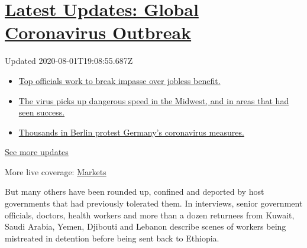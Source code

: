 \hypertarget{latest-updates-global-coronavirus-outbreak}{%
\section{\texorpdfstring{\href{https://www.nytimes3xbfgragh.onion/2020/08/01/world/coronavirus-covid-19.html?action=click\&pgtype=Article\&state=default\&region=MAIN_CONTENT_1\&context=storylines_live_updates}{Latest
Updates: Global Coronavirus
Outbreak}}{Latest Updates: Global Coronavirus Outbreak}}\label{latest-updates-global-coronavirus-outbreak}}

Updated 2020-08-01T19:08:55.687Z

\begin{itemize}
\tightlist
\item
  \href{https://www.nytimes3xbfgragh.onion/2020/08/01/world/coronavirus-covid-19.html?action=click\&pgtype=Article\&state=default\&region=MAIN_CONTENT_1\&context=storylines_live_updates\#link-3ac56579}{Top
  officials work to break impasse over jobless benefit.}
\item
  \href{https://www.nytimes3xbfgragh.onion/2020/08/01/world/coronavirus-covid-19.html?action=click\&pgtype=Article\&state=default\&region=MAIN_CONTENT_1\&context=storylines_live_updates\#link-8796723}{The
  virus picks up dangerous speed in the Midwest, and in areas that had
  seen success.}
\item
  \href{https://www.nytimes3xbfgragh.onion/2020/08/01/world/coronavirus-covid-19.html?action=click\&pgtype=Article\&state=default\&region=MAIN_CONTENT_1\&context=storylines_live_updates\#link-25930521}{Thousands
  in Berlin protest Germany's coronavirus measures.}
\end{itemize}

\href{https://www.nytimes3xbfgragh.onion/2020/08/01/world/coronavirus-covid-19.html?action=click\&pgtype=Article\&state=default\&region=MAIN_CONTENT_1\&context=storylines_live_updates}{See
more updates}

More live coverage:
\href{https://www.nytimes3xbfgragh.onion/live/2020/07/31/business/stock-market-today-coronavirus?action=click\&pgtype=Article\&state=default\&region=MAIN_CONTENT_1\&context=storylines_live_updates}{Markets}

But many others have been rounded up, confined and deported by host
governments that had previously tolerated them. In interviews, senior
government officials, doctors, health workers and more than a dozen
returnees from Kuwait, Saudi Arabia, Yemen, Djibouti and Lebanon
describe scenes of workers being mistreated in detention before being
sent back to Ethiopia.

